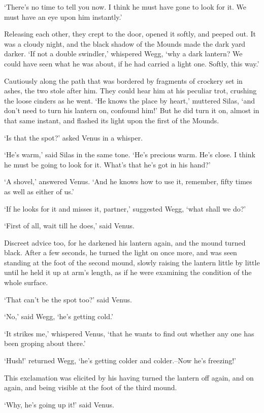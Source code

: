 ‘There’s no time to tell you now. I think he must have gone to look for
it. We must have an eye upon him instantly.’

Releasing each other, they crept to the door, opened it softly, and
peeped out. It was a cloudy night, and the black shadow of the Mounds
made the dark yard darker. ‘If not a double swindler,’ whispered Wegg,
‘why a dark lantern? We could have seen what he was about, if he had
carried a light one. Softly, this way.’

Cautiously along the path that was bordered by fragments of crockery set
in ashes, the two stole after him. They could hear him at his peculiar
trot, crushing the loose cinders as he went. ‘He knows the place by
heart,’ muttered Silas, ‘and don’t need to turn his lantern on, confound
him!’ But he did turn it on, almost in that same instant, and flashed
its light upon the first of the Mounds.

‘Is that the spot?’ asked Venus in a whisper.

‘He’s warm,’ said Silas in the same tone. ‘He’s precious warm. He’s
close. I think he must be going to look for it. What’s that he’s got in
his hand?’

‘A shovel,’ answered Venus. ‘And he knows how to use it, remember, fifty
times as well as either of us.’

‘If he looks for it and misses it, partner,’ suggested Wegg, ‘what shall
we do?’

‘First of all, wait till he does,’ said Venus.

Discreet advice too, for he darkened his lantern again, and the mound
turned black. After a few seconds, he turned the light on once more, and
was seen standing at the foot of the second mound, slowly raising the
lantern little by little until he held it up at arm’s length, as if he
were examining the condition of the whole surface.

‘That can’t be the spot too?’ said Venus.

‘No,’ said Wegg, ‘he’s getting cold.’

‘It strikes me,’ whispered Venus, ‘that he wants to find out whether any
one has been groping about there.’

‘Hush!’ returned Wegg, ‘he’s getting colder and colder.--Now he’s
freezing!’

This exclamation was elicited by his having turned the lantern off
again, and on again, and being visible at the foot of the third mound.

‘Why, he’s going up it!’ said Venus.

